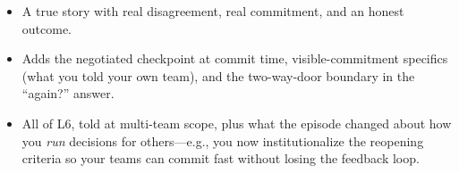 \begin{interviewq}

\goodgreat
\begin{itemize}
    \item {} A true story with real disagreement, real commitment, and an honest outcome.
    \item {} Adds the negotiated checkpoint at commit time, visible-commitment specifics (what you told your own team), and the two-way-door boundary in the ``again?'' answer.
    \item {} All of L6, told at multi-team scope, plus what the episode changed about how you \textit{run} decisions for others---e.g., you now institutionalize the reopening criteria so your teams can commit fast without losing the feedback loop.
\end{itemize}

\end{interviewq}



